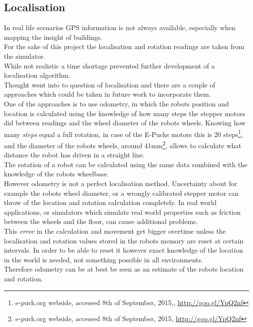 \subsection{Localisation}
In real life scenarios GPS information is not always available, especially when mapping the insight of buildings. \\
For the sake of this project the localisation and rotation readings are taken from the simulator. \\

While not realistic a time shortage prevented further development of a localisation algorithm.\\
Thought went into to question of localisation and there are a couple of approaches which could be taken in future work to incorporate them. \\
One of the approaches is to use odometry, in which the robots position and location is calculated using the knowledge of how many steps the stepper motors did between readings and the wheel diameter of the robots wheels. Knowing how many \textit{steps} equal a full rotation, in case of the E-Pucks motors this is 20 steps\footnote{e-puck.org webside, accessed 8th of September, 2015,, \url{http://goo.gl/YpQ2nf}}, and the diameter of the robots wheels, around 41mm\footnote{e-puck.org webside, accessed 8th of September, 2015, \url{http://goo.gl/YpQ2nf}}, allows to calculate what distance the robot has driven in a straight line. \\

The rotation of a robot can be calculated using the same data combined with the knowledge of the robots wheelbase.\\
However odometry is not a perfect localisation method. Uncertainty about for example the robots wheel diameter, or a wrongly calibrated stepper motor can throw of the location and rotation calculation completely. In real world applications, or simulators which simulate real world properties such as friction between the wheels and the floor, can cause additional problems. \\
This \textit{error} in the calculation and movement get bigger overtime unless the localisation and rotation values stored in the robots memory are reset at certain intervals. In order to be able to reset it however exact knowledge of the location in the world is needed, not something possible in all environments.\\
Therefore odometry can be at best be seen as an estimate of the robots location and rotation. 

